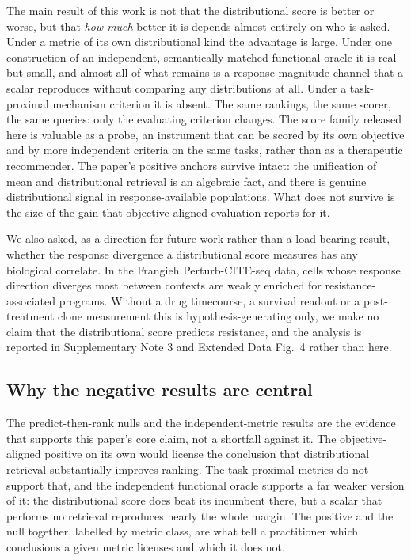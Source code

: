 \documentclass[11pt,letterpaper]{article}
\begin{document}
The main result of this work is not that the distributional score is better or worse, but that \emph{how much} better
it is depends almost entirely on who is asked. Under a metric of its own distributional kind the
advantage is large. Under one construction of an independent, semantically matched functional oracle it is real but
small, and almost all of what remains is a response-magnitude channel that a scalar reproduces
without comparing any distributions at all. Under a task-proximal mechanism criterion it is
absent. The same rankings, the same scorer, the same queries: only the evaluating criterion
changes. The score family released here is valuable as a probe, an instrument that can be
scored by its own objective and by more independent criteria on the same tasks, rather than as
a therapeutic recommender. The paper's
positive anchors survive intact: the unification of mean and distributional retrieval is an
algebraic fact, and there is genuine distributional signal in response-available populations. What
does not survive is the size of the gain that objective-aligned evaluation reports for it.

We also asked, as a direction for future work rather than a load-bearing result, whether the
response divergence a distributional score measures has any biological correlate. In the Frangieh
Perturb-CITE-seq data, cells whose response direction diverges most between contexts are weakly
enriched for resistance-associated programs. Without a drug timecourse, a survival readout or a
post-treatment clone measurement this is hypothesis-generating only, we make no claim that
the distributional score predicts resistance, and the analysis is reported in Supplementary Note 3 and Extended Data
Fig.~4 rather than here.

\subsection*{Why the negative results are central}

The predict-then-rank nulls and the independent-metric results are the evidence that supports this
paper's core claim, not a shortfall against it. The objective-aligned positive on its own would
license the conclusion that distributional retrieval substantially improves ranking. The
task-proximal metrics do not support that, and the independent functional oracle supports a far
weaker version of it: the distributional score does beat its incumbent there, but a scalar that
performs no retrieval reproduces nearly the whole margin. The positive and the null together,
labelled by metric class, are what tell a practitioner which conclusions a given metric licenses
and which it does not.
\end{document}

